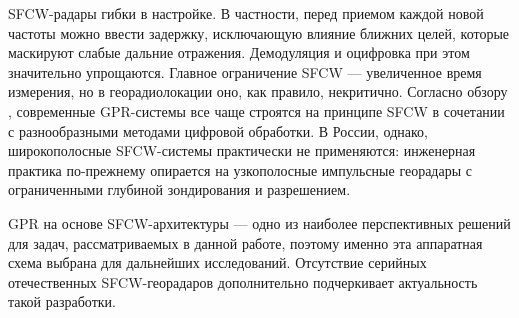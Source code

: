 SFCW-радары гибки в настройке. В частности, перед приемом каждой новой частоты можно ввести задержку, исключающую влияние ближних целей, которые маскируют слабые дальние отражения. Демодуляция и оцифровка при этом значительно упрощаются. Главное ограничение SFCW --- увеличенное время измерения, но в георадиолокации оно, как правило, некритично. Согласно обзору \cite{sun2019advanced}, современные GPR-системы все чаще строятся на принципе SFCW \cite{eide2019advanced} в сочетании с разнообразными методами цифровой обработки. В России, однако, широкополосные SFCW-системы практически не применяются: инженерная практика по-прежнему опирается на узкополосные импульсные георадары с ограниченными глубиной зондирования и разрешением.

GPR на основе SFCW-архитектуры --- одно из наиболее перспективных решений для задач, рассматриваемых в данной работе, поэтому именно эта аппаратная схема выбрана для дальнейших исследований. Отсутствие серийных отечественных SFCW-георадаров дополнительно подчеркивает актуальность такой разработки.
